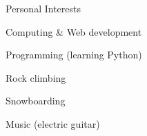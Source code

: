 \documentclass{cv}
\begin{document}

\begin{rSection}{Personal Interests}

\begin{rSubsection}{}{}{}{}
\item Computing \& Web development
\item Programming (learning Python)
\item Rock climbing
\item Snowboarding
\item Music (electric guitar)
\end{rSubsection}

\end{rSection}

\end{document}
